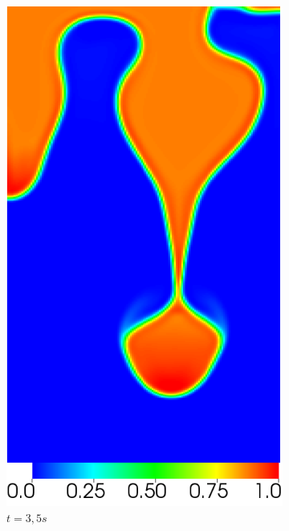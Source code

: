 \begin{figure}[H]
	\centering
	\ContinuedFloat
	\begin{subfigure}[ht!]{0.2\textwidth}
		\centering
		\includegraphics[width=1\textwidth]{figure/PT_RT/concent1/visit0004.png}
		\caption{$t=3,5s$}
	\end{subfigure}
	\begin{subfigure}[ht!]{0.2\textwidth}
		\centering

\end{subfigure}
\end{figure}
